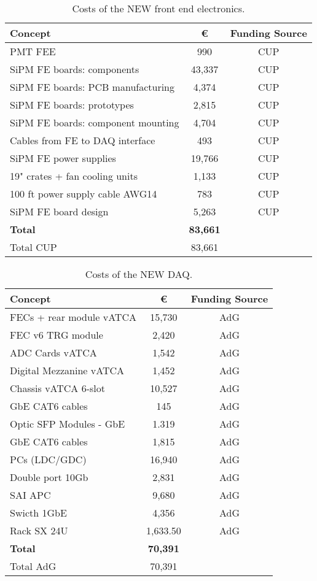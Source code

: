 \begin{table}[h!]
\begin{center}
\begin{tabular}{|l|c|c|}
\hline
 Concept & \euro & Funding Source \\
 \hline
 PMT FEE & 990 & CUP \\
 SiPM FE boards:  components	&	43,337 & CUP \\
SiPM FE boards: PCB manufacturing &	4,374 & CUP \\
SiPM FE boards: prototypes &	2,815 & CUP \\
SiPM FE boards: component mounting &	4,704 & CUP \\
Cables from FE to DAQ interface &	493 & CUP \\
SiPM FE power supplies & 19,766 & CUP \\
19" crates + fan cooling units	& 1,133 & CUP \\
100 ft power supply cable AWG14 &	783 & CUP \\
SiPM FE board design &	5,263 & CUP \\
  \hline
{\bf Total}	&	{\bf 83,661}	& \\
 Total CUP	&	83,661	& \\
 \hline\hline
\end{tabular}  
\caption{Costs of the NEW front end electronics.}
\label{tab.new:FEE}
\end{center}
\end{table} 

\begin{table}[h!]
\begin{center}
\begin{tabular}{|l|c|c|}
\hline
 Concept & \euro & Funding Source \\
 \hline
FECs + rear module vATCA &	15,730 & AdG \\
FEC v6 TRG module		&	2,420 & AdG \\
ADC Cards vATCA & 	1,542 & AdG \\
Digital Mezzanine vATCA & 1,452 & AdG \\
Chassis vATCA 6-slot	&	10,527 & AdG \\
GbE CAT6 cables		& 145 & AdG \\
Optic SFP Modules - GbE	& 1.319 & AdG \\
GbE CAT6 cables &	1,815 & AdG \\
PCs (LDC/GDC) & 16,940 & AdG \\
Double port 10Gb &	2,831 & AdG \\
SAI	APC	&	9,680 & AdG \\
Swicth 1GbE	& 4,356& AdG \\
Rack SX 24U & 1,633.50 & AdG \\
  \hline
{\bf Total} &	{\bf 70,391}	& \\
 Total AdG	&	70,391	& \\
 \hline\hline
\end{tabular}  
\caption{Costs of the NEW DAQ.}
\label{tab.new:DAQ}
\end{center}
\end{table} 



